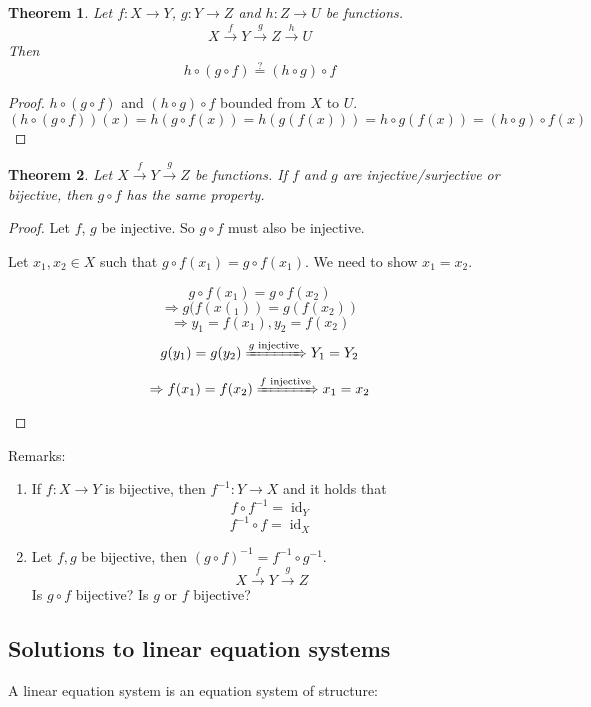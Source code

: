\documentclass[a4paper,landscape,twocolumn]{article}
\newtheorem{theorem}{Theorem}
\begin{document}
\begin{theorem}
Let $f: X\rightarrow Y$, $g: Y\rightarrow Z$ and $h: Z \rightarrow U$ be functions.
\[ X \xrightarrow{f} Y \xrightarrow{g} Z \xrightarrow{h} U \]
Then
\[ h\circ(g\circ f) \overset{?}{=} (h\circ g)\circ f \]
\end{theorem}

\begin{proof}
$h\circ (g\circ f)$ and $(h\circ g) \circ f$ bounded from $X$ to $U$.
\[
    (h\circ (g\circ f))(x) =
    h(g\circ f(x)) =
    h(g(f(x))) =
    h\circ g(f(x)) =
    (h\circ g)\circ f(x)
\]
\end{proof}

\begin{theorem}
  Let $X \xrightarrow{f} Y \xrightarrow{g} Z$ be functions.
  If $f$ and $g$ are injective/surjective or bijective,
  then $g\circ f$ has the same property.
\end{theorem}

\begin{proof}
  Let $f$, $g$ be injective. So $g\circ f$ must also be injective.

  Let $x_1,x_2 \in X$ such that $g\circ f(x_1) = g\circ f(x_1)$.
  We need to show $x_1 = x_2$.

  \[ g\circ f(x_1) = g\circ f(x_2) \]
  \[ \Rightarrow g(f(x(_1)) = g(f(x_2)) \]
  \[ \Rightarrow y_1 = f(x_1), y_2 = f(x_2) \]
  \[ g(y_1) = g(y_2) \xRightarrow{g \text{ injective}} Y_1 = Y_2 \]
  \[ \Rightarrow f(x_1) = f(x_2) \xRightarrow{f \text{ injective}} x_1 = x_2 \]
\end{proof}

Remarks:
\begin{enumerate}
  \item
    If $f: X \rightarrow Y$  is bijective, then $f^{-1}: Y \rightarrow X$ and it holds that
    \[ f\circ f^{-1} = \operatorname{id}_Y \]
    \[ f^{-1}\circ f = \operatorname{id}_X \]

  \item
    Let $f,g$ be bijective, then $(g\circ f)^{-1} = f^{-1} \circ g^{-1}$.
    \[ X \xrightarrow{f} Y \xrightarrow{g} Z \]
    Is $g\circ f$ bijective? Is $g$ or $f$ bijective?
\end{enumerate}

\subsection{Solutions to linear equation systems}

A linear equation system is an equation system of structure:
\end{document}

